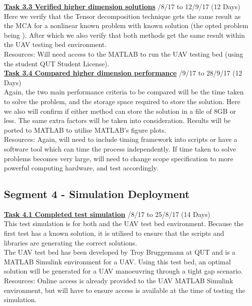 \documentclass[11pt,draftd]{article}
\begin{document}
\begin{appendices}
	\noindent\underline{\textbf{Task 3.3 Verified higher dimension solutions}} /8/17 to 12/9/17 (12 Days) \\
	
	Here we verify that the Tensor decomposition technique gets the same result as the MCA for a nonlinear known problem with known solution (the opted problem being \cite{zylong}). After which we also verify that both methods get the same result within the UAV testing bed environment. \\
	Resources: Will need access to the MATLAB to run the UAV testing bed (using the student QUT Student License).\\
	
	\noindent\underline{\textbf{Task 3.4 Compared higher dimension performance}} /9/17 to 28/9/17 (12 Days) \\
	
	Again, the two main performance criteria to be compared will be the time taken to solve the problem, and the storage space required to store the solution. Here we also will confirm if either method can store the solution in a file of 8GB or less. The same extra factors will be taken into consideration. Results will be ported to MATLAB to utilise MATLAB’s figure plots. \\
	Resources: Again, will need to include timing framework into scripts or have a software tool which can time the process independently. If time taken to solve problems becomes very large, will need to change scope specification to more powerful computing hardware, and test accordingly.
	
	\subsection{Segment 4 - Simulation Deployment}
	\underline{\textbf{Task 4.1 Completed test simulation}} /8/17 to 25/8/17 (14 Days) \\
	
	This test simulation is for both \cite{zylong} and the UAV test bed environment. Because the first test has a known solution, it is utilised to ensure that the scripts and libraries are generating the correct solutions. \\
	The UAV test bed has been developed by Troy Bruggemann at QUT and is a MATLAB Simulink environment for a UAV. Using this test bed, an optimal solution will be generated for a UAV manoeuvring through a tight gap scenario. \\
	Resources: Online access is already provided to the UAV MATLAB Simulink environment, but will have to ensure access is available at the time of testing the simulation.\\
	

\end{appendices}
\end{document}
